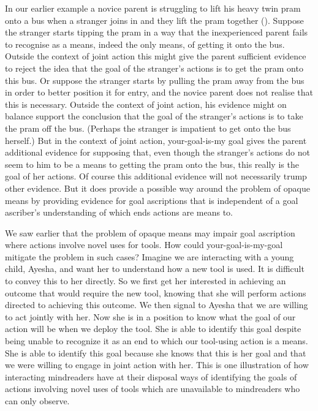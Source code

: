 \documentclass[14pt,a4paper]{extarticle}
\begin{document}
In our earlier example 
a novice parent is struggling to lift his heavy twin pram onto a bus when a stranger joins in and they lift the pram together ().
Suppose the stranger starts tipping the pram in a way that the inexperienced parent fails to recognise as a means, indeed the only means, of getting it onto the bus.
Outside the context of joint action this might give the parent sufficient evidence to reject the idea that the goal of the stranger's actions is to get the pram onto this bus.
Or suppose the stranger starts by pulling the pram away from the bus in order to better position it for entry,
and the novice parent does not realise that this is necessary.
Outside the context of joint action, 
his evidence might on balance support the conclusion that the goal of the stranger's actions is to take the pram off the bus.
(Perhaps the stranger is impatient to get onto the bus herself.)
But in the context of joint action,
your-goal-is-my goal gives the parent  additional evidence for supposing that, 
even though the stranger's actions do not seem to him to be a means to getting the pram onto the bus, 
this really is the goal of her actions.
Of course this additional evidence will not necessarily trump   other evidence.
But it does provide a possible way around the problem of opaque means by providing evidence for goal ascriptions that is independent of a goal ascriber's understanding of which ends actions are means to.

We saw earlier that the problem of opaque means  may impair goal ascription where actions involve novel uses for tools.
How could your-goal-is-my-goal mitigate the problem in such cases?
Imagine we are interacting with a young child,
Ayesha,
and want her to understand how a new tool is used.  
It is difficult to convey this to her directly.  
So we first get her interested in achieving an outcome that would require the new tool,
knowing that she will perform actions directed to achieving this outcome.  
We then signal to Ayesha that we are willing to act jointly with her.  
Now she is in a position to know what the goal of our action will be when we deploy the tool.  
She is able to identify this goal 
despite being unable to recognize it as an end to which our tool-using action is a means.
She is able to identify this goal 
because she knows that this is her goal
and that we were willing to engage in joint action with her.
This is one illustration of how 
interacting mindreaders have at their disposal ways of
identifying the goals of actions involving novel uses of tools
which are unavailable to mindreaders who can only observe.
\end{document}
